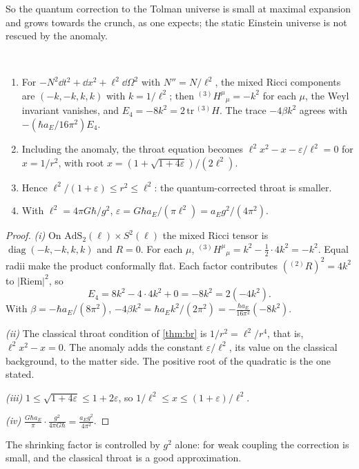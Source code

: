So the quantum correction to the Tolman universe is small at maximal expansion and grows towards the crunch, as one expects; the static Einstein universe is not rescued by the anomaly.

\begin{theorem}\label{thm:throatback}\ver\
\begin{enumerate}[label=(\roman*)]
\item For $-N^2\dd t^2+\dd x^2+\ell^2\dd\Omega^2$ with $N''=N/\ell^2$, the mixed Ricci components are $(-k,-k,k,k)$ with $k=1/\ell^2$; then ${}^{(3)}\!H^\mu{}_\mu=-k^2$ for each $\mu$, the Weyl invariant vanishes, and $E_4=-8k^2=2\,\mathrm{tr}\,{}^{(3)}\!H$. The trace $-4\beta k^2$ agrees with $-(\hbar a_E/16\pi^2)E_4$.
\item Including the anomaly, the throat equation becomes $\ell^2x^2-x-\varepsilon/\ell^2=0$ for $x=1/r^2$, with root $x=(1+\sqrt{1+4\varepsilon})/(2\ell^2)$.
\item Hence $\ell^2/(1+\varepsilon)\le r^2\le\ell^2$: the quantum-corrected throat is smaller.
\item With $\ell^2=4\pi G\hbar/g^2$, $\varepsilon=G\hbar a_E/(\pi\ell^2)=a_Eg^2/(4\pi^2)$.
\end{enumerate}
\end{theorem}
\begin{proof}
\emph{(i)} On $\mathrm{AdS}_2(\ell)\times S^2(\ell)$ the mixed Ricci tensor is $\operatorname{diag}(-k,-k,k,k)$ and $R=0$. For each $\mu$, ${}^{(3)}\!H^\mu{}_\mu=k^2-\frac12\cdot4k^2=-k^2$. Equal radii make the product conformally flat. Each factor contributes $({}^{(2)}\!R)^2=4k^2$ to $|\mathrm{Riem}|^2$, so
\[
E_4=8k^2-4\cdot4k^2+0=-8k^2=2(-4k^2).
\]
With $\beta=-\hbar a_E/(8\pi^2)$, $-4\beta k^2=\hbar a_Ek^2/(2\pi^2)=-\frac{\hbar a_E}{16\pi^2}(-8k^2)$.

\emph{(ii)} The classical throat condition of \cref{thm:br} is $1/r^2=\ell^2/r^4$, that is, $\ell^2x^2-x=0$. The anomaly adds the constant $\varepsilon/\ell^2$, its value on the classical background, to the matter side. The positive root of the quadratic is the one stated.

\emph{(iii)} $1\le\sqrt{1+4\varepsilon}\le1+2\varepsilon$, so $1/\ell^2\le x\le(1+\varepsilon)/\ell^2$.

\emph{(iv)} $\frac{G\hbar a_E}{\pi}\cdot\frac{g^2}{4\pi G\hbar}=\frac{a_Eg^2}{4\pi^2}$.
\end{proof}


The shrinking factor is controlled by $g^2$ alone: for weak coupling the correction is small, and the classical throat is a good approximation.

